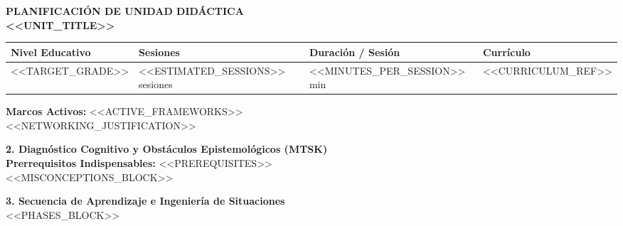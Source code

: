 \documentclass[11pt,letterpaper]{article}
\begin{document}
\begin{center}
  {\LARGE \textbf{\color{darkSlate} PLANIFICACIÓN DE UNIDAD DIDÁCTICA}}\\[0.2cm]
  {\Large \textbf{\color{primaryBlue} <<UNIT_TITLE>>}}
\end{center}

\vspace{0.3cm}

\noindent
\begin{tabular}{|p{4.5cm}|p{3.5cm}|p{3.5cm}|p{4cm}|}
\hline
\textbf{Nivel Educativo} & \textbf{Sesiones} & \textbf{Duración / Sesión} & \textbf{Currículo} \\
\hline
<<TARGET_GRADE>> & <<ESTIMATED_SESSIONS>> sesiones & <<MINUTES_PER_SESSION>> min & <<CURRICULUM_REF>> \\
\hline
\end{tabular}

\vspace{0.4cm}

\begin{tcolorbox}[colback=softBg,colframe=neutralGray,arc=1mm,title=\textbf{\color{darkSlate}1. Marco Teórico y Articulación Metodológica}]
\small
\textbf{Marcos Activos:} <<ACTIVE_FRAMEWORKS>>\\[0.15cm]
<<NETWORKING_JUSTIFICATION>>
\end{tcolorbox}

\vspace{0.3cm}

\noindent \textbf{\large 2. Diagnóstico Cognitivo y Obstáculos Epistemológicos (MTSK)}\\[0.1cm]
\small \textbf{Prerrequisitos Indispensables:} <<PREREQUISITES>>\\[0.2cm]
<<MISCONCEPTIONS_BLOCK>>

\vspace{0.4cm}

\noindent \textbf{\large 3. Secuencia de Aprendizaje e Ingeniería de Situaciones}\\[0.2cm]
<<PHASES_BLOCK>>
\end{document}

